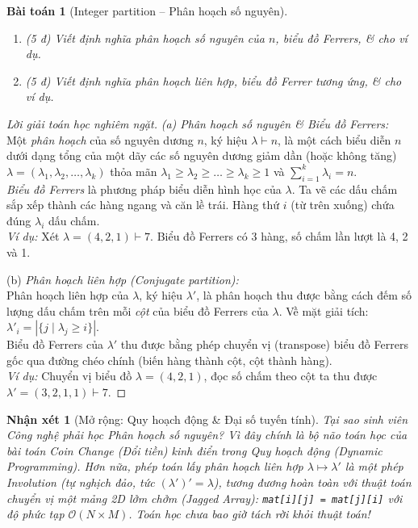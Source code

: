 \documentclass{article}
\newtheorem{baitoan}{Bài toán}
\newtheorem{nhanxet}{Nhận xét}
\begin{document}
\begin{baitoan}[Integer partition -- Phân hoạch số nguyên]
	\begin{enumerate}[label=(\alph*)]
		\item \emph{(5 đ)} Viết định nghĩa phân hoạch số nguyên của $n$, biểu đồ Ferrers, \& cho ví dụ. 
		\item \emph{(5 đ)} Viết định nghĩa phân hoạch liên hợp, biểu đồ Ferrer tương ứng, \& cho ví dụ.	
	\end{enumerate}
\end{baitoan}

\begin{proof}[Lời giải toán học nghiêm ngặt]
	\emph{(a) Phân hoạch số nguyên \& Biểu đồ Ferrers:}\\
	Một \emph{phân hoạch} của số nguyên dương $n$, ký hiệu $\lambda \vdash n$, là một cách biểu diễn $n$ dưới dạng tổng của một dãy các số nguyên dương giảm dần (hoặc không tăng) $\lambda = (\lambda_1, \lambda_2, \ldots, \lambda_k)$ thỏa mãn $\lambda_1 \ge \lambda_2 \ge \ldots \ge \lambda_k \ge 1$ và $\sum_{i=1}^k \lambda_i = n$. \\
	\emph{Biểu đồ Ferrers} là phương pháp biểu diễn hình học của $\lambda$. Ta vẽ các dấu chấm sắp xếp thành các hàng ngang và căn lề trái. Hàng thứ $i$ (từ trên xuống) chứa đúng $\lambda_i$ dấu chấm. \\
	\textit{Ví dụ:} Xét $\lambda = (4,2,1) \vdash 7$. Biểu đồ Ferrers có 3 hàng, số chấm lần lượt là 4, 2 và 1.
	
	\item(b) \textit{Phân hoạch liên hợp (Conjugate partition):}\\
	Phân hoạch liên hợp của $\lambda$, ký hiệu $\lambda'$, là phân hoạch thu được bằng cách đếm số lượng dấu chấm trên mỗi \emph{cột} của biểu đồ Ferrers của $\lambda$. Về mặt giải tích: $\lambda'_i = |\{j \mid \lambda_j \ge i\}|$. \\
	Biểu đồ Ferrers của $\lambda'$ thu được bằng phép chuyển vị (transpose) biểu đồ Ferrers gốc qua đường chéo chính (biến hàng thành cột, cột thành hàng). \\
	\textit{Ví dụ:} Chuyển vị biểu đồ $\lambda = (4,2,1)$, đọc số chấm theo cột ta thu được $\lambda' = (3,2,1,1) \vdash 7$.
\end{proof}

\begin{nhanxet}[Mở rộng: Quy hoạch động \& Đại số tuyến tính]
	Tại sao sinh viên Công nghệ phải học Phân hoạch số nguyên? Vì đây chính là bộ não toán học của bài toán \emph{Coin Change} (Đổi tiền) kinh điển trong \emph{Quy hoạch động (Dynamic Programming)}. Hơn nữa, phép toán lấy phân hoạch liên hợp $\lambda \mapsto \lambda'$ là một phép \emph{Involution} (tự nghịch đảo, tức $(\lambda')' = \lambda$), tương đương hoàn toàn với thuật toán chuyển vị một mảng 2D lởm chởm (\textit{Jagged Array}): \texttt{mat[i][j] = mat[j][i]} với độ phức tạp $\mathcal{O}(N \times M)$. Toán học chưa bao giờ tách rời khỏi thuật toán!
\end{nhanxet}
\end{document}
